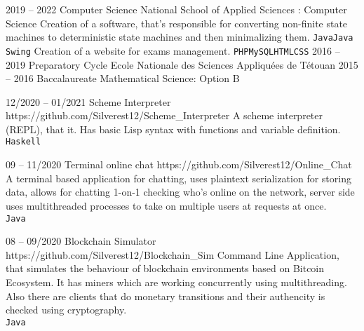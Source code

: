 \documentclass[10pt]{developercv} %
\begin{document}


\begin{entrylist}
	\entry
		{2019 -- 2022}
		{Computer Science}
		{National School of Applied Sciences : Computer Science}
	    {   {Creation of a software, that's responsible for converting non-finite state machines
                to deterministic state machines and then minimalizing them.
            \newline\texttt{Java}\slashsep\texttt{Java Swing}}
            {\newline Creation of a website for exams management.
            \newline\texttt{PHP}\slashsep\texttt{MySQL}\slashsep\texttt{HTML}\slashsep\texttt{CSS}}
        }
	\entry
		{2016 -- 2019}
		{Preparatory Cycle}
		{Ecole Nationale des Sciences Appliquées de Tétouan}
        {}
	\entry
		{2015 -- 2016}
		{Baccalaureate Mathematical Science: Option B}
		{}
		{}
\end{entrylist}




\begin{entrylist}
	\entry
		{12/2020 -- 01/2021}
		{Scheme Interpreter}
		{https://github.com/Silverest12/Scheme\_Interpreter}
        {A scheme interpreter (REPL), that it. Has basic Lisp syntax 
        with functions and variable definition.\\ \texttt{Haskell}}

    \entry
		{09 -- 11/2020}
		{Terminal online chat}
		{https://github.com/Silverest12/Online\_Chat}
        {A terminal based application for chatting, uses plaintext 
        serialization for storing data, allows for chatting 1-on-1
        checking who's online on the network, server side uses 
        multithreaded processes to take on multiple users at requests
        at once.\\ \texttt{Java}}

    \entry
		{08 -- 09/2020}
		{Blockchain Simulator}
		{https://github.com/Silverest12/Blockchain\_Sim}
        {Command Line Application, that simulates the behaviour of
        blockchain environments based on Bitcoin Ecosystem. It has
        miners which are working concurrently using multithreading. 
        Also there are clients that do monetary transitions and their
        authencity is checked using cryptography.\\ \texttt{Java}}
\end{entrylist}
\end{document}
